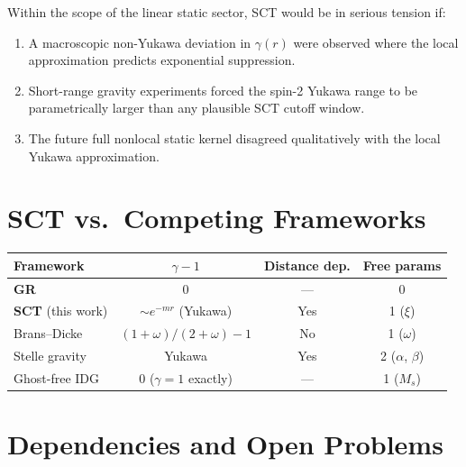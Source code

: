 \documentclass[11pt,a4paper]{article}
\begin{document}
Within the scope of the linear static sector, SCT would be in serious tension if:
\begin{enumerate}[label=\arabic*., leftmargin=2em]
  \item A macroscopic non-Yukawa deviation in $\gamma(r)$ were observed where
  the local approximation predicts exponential suppression.
  \item Short-range gravity experiments forced the spin-2 Yukawa range to be
  parametrically larger than any plausible SCT cutoff window.
  \item The future full nonlocal static kernel disagreed qualitatively with
  the local Yukawa approximation.
\end{enumerate}

\section{SCT vs.\ Competing Frameworks}

\begin{center}
\renewcommand{\arraystretch}{1.3}
\begin{tabular}{lccc}
  \toprule
  \textbf{Framework} & $\gamma - 1$ & \textbf{Distance dep.} & \textbf{Free params} \\
  \midrule
  \textbf{GR} & 0 & --- & 0 \\
  \textbf{SCT} (this work) & $\sim e^{-m r}$ (Yukawa) & Yes & 1 ($\xi$) \\
  Brans--Dicke & $(1+\omega)/(2+\omega) - 1$ & No & 1 ($\omega$) \\
  Stelle gravity & Yukawa & Yes & 2 ($\alpha$, $\beta$) \\
  Ghost-free IDG & 0 ($\gamma = 1$ exactly) & --- & 1 ($M_s$) \\
  \bottomrule
\end{tabular}
\end{center}

\section{Dependencies and Open Problems}
\end{document}
